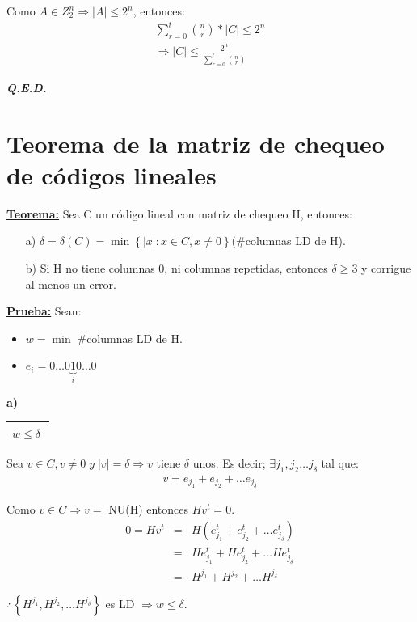 \documentclass[12pt,a4paper]{report}
\newcounter{neq}
\newcommand{\QED}{\hfill \textit{\textbf{Q.E.D.}}}
\begin{document}
			\par Como $A \in Z_{2}^{n} \Rightarrow \lvert A\rvert \leq 2^{n}$, entonces:
			\begin{eqnarray}
				\nonumber \sum_{r = 0}^{t} {n \choose r} * \lvert C \rvert \leq 2^{n} \\
				\nonumber \Rightarrow \lvert C \rvert \leq \frac{2^{n}}{\sum_{r = 0}^{t} {n \choose r}}
			\end{eqnarray}

		\QED

	\section{Teorema de la matriz de chequeo de códigos lineales}
		\textbf{\underline{Teorema:}} Sea C un código lineal con matriz de chequeo H, entonces:
			\begin{itemize}
				\item[a)] $\delta = \delta(C) = \min \left\lbrace \lvert x \rvert : x \in C , x \neq 0 \right\rbrace (\#$columnas LD de H).
				\item[b)] Si H no tiene columnas 0, ni columnas repetidas, entonces $\delta \geq 3$ y corrigue al menos un error.
			\end{itemize}

		\textbf{\underline{Prueba:}} Sean:
			\begin{itemize}
				\item $w = \min \; \#$columnas LD de H.
				\item $e_{i} = 0 \dotsc 0 \underbrace{1}_{i} 0 \dotsc 0$
			\end{itemize}

			\textbf{a)} 
			
			\begin{tabular}{|c|} \hline $w \leq \delta \; $ \\\hline \end{tabular}
			\vspace{3mm}
			\par Sea $v \in C , v \neq 0 \; y \; \lvert v \rvert = \delta \Rightarrow v$ tiene $\delta$ unos. Es decir; $\exists j_{1}, j_{2} \dotsc j_{\delta}$ tal que:
			\begin{eqnarray}
				\nonumber v = e_{j_{1}} + e_{j_{2}} + \dotsc e_{j_{\delta}}
			\end{eqnarray}

			\par Como $ v \in C \Rightarrow v =$ NU(H) entonces $Hv^{t} = 0$.
			\begin{eqnarray}
				\nonumber 0 = Hv^{t} &=& H(e_{j_{1}}^{t} + e_{j_{2}}^{t} + \dotsc e_{j_{\delta}}^{t}) \\
				\nonumber &=& H e_{j_{1}}^{t} + H e_{j_{2}}^{t} + \dotsc H e_{j_{\delta}}^{t} \\
				\nonumber &=& H^{j_{1}} + H^{j_{2}} + \dotsc H^{j_{\delta}}
			\end{eqnarray}
			\par $\therefore \left\lbrace H^{j_{1}}, H^{j_{2}}, \dotsc H^{j_{\delta}} \right\rbrace$ es LD $\Rightarrow w \leq \delta$.
\end{document}
